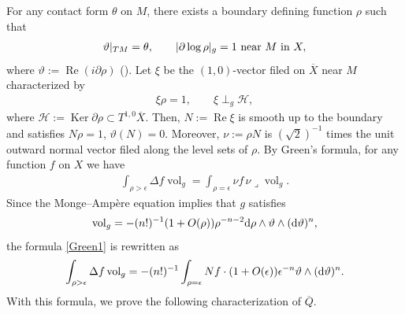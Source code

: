 \documentclass[pdftex]{sigma}
\numberwithin{equation}{section}
\begin{document}
For any contact form $\theta$ on $M$, there exists a boundary def\/ining function $\rho$ such that
\begin{gather}\label{bdf}
\vartheta|_{TM}=\theta, \qquad |\partial\log\rho|_g=1\ {\rm near}\ M\ {\rm in}\ X,
\end{gather}
where $\vartheta:=\operatorname{Re} (i\partial\rho)$ (\cite[Lemma 3.1]{Seshadri}). Let $\xi$ be the $(1, 0)$-vector f\/iled on $\overline X$ near $M$ characterized by
\begin{gather*}
\xi\rho=1, \qquad \xi\perp_g \mathcal{H},
\end{gather*}
where $\mathcal{H}:=\operatorname{Ker}\partial \rho\subset T^{1,0}\overline X$. Then, $N:=\operatorname{Re}\xi$ is smooth up to the boundary and satisf\/ies $N\rho=1$, $\vartheta(N)=0$. Moreover,
$\nu:=\rho N$ is $(\sqrt 2)^{-1}$ times the unit outward normal vector f\/iled along the level sets of $\rho$. By Green's formula, for any function $f$ on $X$ we have
\begin{gather}\label{Green1}
\int_{\rho>\epsilon} \Delta f\operatorname{vol}_g= \int_{\rho=\epsilon} \nu f\, \nu\lrcorner\operatorname{vol}_g.
\end{gather}
Since the Monge--Amp\`ere equation implies that $g$ satisf\/ies
\begin{gather*}
\operatorname{vol}_g=-(n!)^{-1}(1+O(\rho))\rho^{-n-2}{\rm d}\rho\wedge\vartheta\wedge({\rm d}\vartheta)^n,
\end{gather*}
the formula \eqref{Green1} is rewritten as
\begin{gather}\label{Green2}
\int_{\rho>\epsilon} \Delta f\operatorname{vol}_g=-(n!)^{-1}\int_{\rho=\epsilon} N f\cdot(1+O(\epsilon))\epsilon^{-n} \vartheta\wedge ({\rm d}\vartheta)^n.
\end{gather}
With this formula, we prove the following characterization of $\overline Q$.
\end{document}
